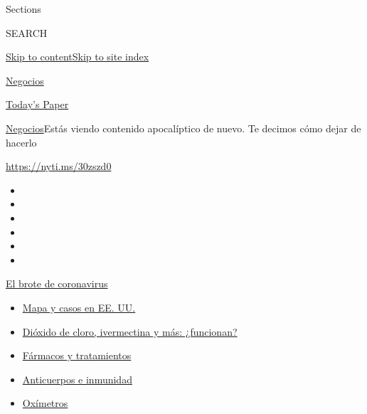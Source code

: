 Sections

SEARCH

\protect\hyperlink{site-content}{Skip to
content}\protect\hyperlink{site-index}{Skip to site index}

\href{https://www.nytimes3xbfgragh.onion/es/section/negocios}{Negocios}

\href{https://myaccount.nytimes3xbfgragh.onion/auth/login?response_type=cookie\&client_id=vi}{}

\href{https://www.nytimes3xbfgragh.onion/section/todayspaper}{Today's
Paper}

\href{/es/section/negocios}{Negocios}\textbar{}Estás viendo contenido
apocalíptico de nuevo. Te decimos cómo dejar de hacerlo

\url{https://nyti.ms/30zszd0}

\begin{itemize}
\item
\item
\item
\item
\item
\item
\end{itemize}

\href{https://www.nytimes3xbfgragh.onion/es/spotlight/coronavirus?action=click\&pgtype=Article\&state=default\&region=TOP_BANNER\&context=storylines_menu}{El
brote de coronavirus}

\begin{itemize}
\tightlist
\item
  \href{https://www.nytimes3xbfgragh.onion/es/interactive/2020/espanol/mundo/coronavirus-en-estados-unidos.html?action=click\&pgtype=Article\&state=default\&region=TOP_BANNER\&context=storylines_menu}{Mapa
  y casos en EE. UU.}
\item
  \href{https://www.nytimes3xbfgragh.onion/es/2020/07/23/espanol/america-latina/bolivia-cloro-coronavirus-ivermectina.html?action=click\&pgtype=Article\&state=default\&region=TOP_BANNER\&context=storylines_menu}{Dióxido
  de cloro, ivermectina y más: ¿funcionan?}
\item
  \href{https://www.nytimes3xbfgragh.onion/es/interactive/2020/science/coronavirus-tratamientos-curas.html?action=click\&pgtype=Article\&state=default\&region=TOP_BANNER\&context=storylines_menu}{Fármacos
  y tratamientos}
\item
  \href{https://www.nytimes3xbfgragh.onion/es/2020/07/28/espanol/ciencia-y-tecnologia/anticuerpos-coronavirus-inmunidad.html?action=click\&pgtype=Article\&state=default\&region=TOP_BANNER\&context=storylines_menu}{Anticuerpos
  e inmunidad}
\item
  \href{https://www.nytimes3xbfgragh.onion/es/2020/04/29/espanol/estilos-de-vida/oximetro-para-que-sirve.html?action=click\&pgtype=Article\&state=default\&region=TOP_BANNER\&context=storylines_menu}{Oxímetros}
\end{itemize}

